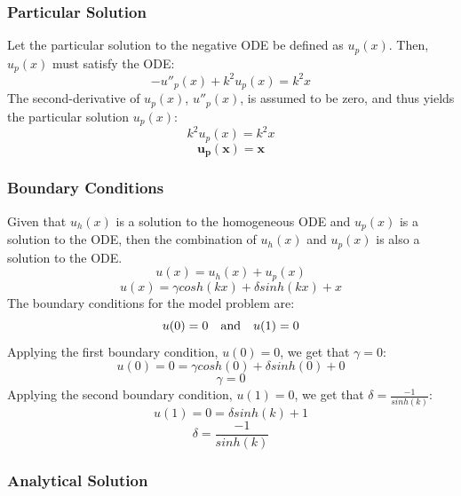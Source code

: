 \documentclass[10pt, reqno]{article}		%
\numberwithin{equation}{section}
\begin{document}
\subsubsection{Particular Solution}

Let the particular solution to the negative ODE be defined as $u_p(x)$. Then, $u_p(x)$ must satisfy the ODE:
\begin{equation}
-u''_p(x) + k^2u_p(x) = k^2x
\end{equation}
The second-derivative of $u_p(x)$, $u''_p(x)$, is assumed to be zero, and thus yields the particular solution $u_p(x)$:
\begin{equation}
k^2u_p(x) = k^2x
\end{equation}
\begin{equation}
\mathbf{u_p(x) = x}
\end{equation}

\subsubsection{Boundary Conditions}

Given that $u_h(x)$ is a solution to the homogeneous ODE and $u_p(x)$ is a solution to the ODE, then the combination of $u_h(x)$ and $u_p(x)$ is also a solution to the ODE.
\begin{equation}
u(x) = u_h(x) + u_p(x)
\end{equation}
\begin{equation}
u(x) = \gamma cosh(kx) + \delta sinh(kx) + x
\end{equation}
The boundary conditions for the model problem are:
\begin{equation}
u(0) = 0 \quad \textnormal{and} \quad u(1) = 0 
\end{equation}
Applying the first boundary condition, $u(0) = 0$, we get that $\gamma = 0$:
\begin{equation}
u(0) = 0 = \gamma cosh(0) + \delta sinh(0) + 0
\end{equation}
\begin{equation}
\gamma = 0
\end{equation}
Applying the second boundary condition, $u(1) = 0$, we get that $\delta = \frac{-1}{sinh(k)}$:
\begin{equation}
u(1) = 0 = \delta sinh(k) + 1
\end{equation}
\begin{equation}
\delta = \frac{-1}{sinh(k)}
\end{equation}

\subsubsection{Analytical Solution}
\end{document}
